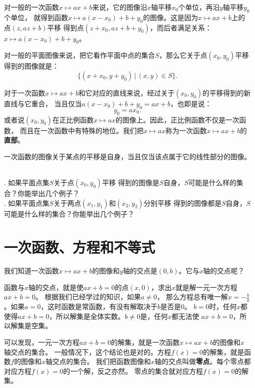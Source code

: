\documentclass[12pt,UTF8,fontset=none]{ctexbook}
\begin{document}
对一般的一次函数$x\mapsto ax+b$来说，它的图像沿$x$轴平移$x_0$个单位，再沿$y$轴平移$y_0$个单位，
就得到函数$x\mapsto a(x-x_0)+b+y_0$的图像。这是因为$x\mapsto ax+b$上的点$(z, az+b)$平移
得到点$(z+x_0, az+b+y_0)$，而后者满足关系：$x\mapsto a(x-x_0)+b+y_0$。

对一般的平面图像来说，把它看作平面中点的集合$S$，那么它关于点$(x_0, y_0)$平移
得到的图像就是：
$$\{(x+x_0, y+y_0) \,|\, (x,y)\in S \}.$$

对于一次函数$x\mapsto ax+b$和它对应的直线来说，经过关于$(x_0, y_0)$的平移得到的新直线与它重合，
当且仅当$a(x-x_0)+b+y_0 = ax + b$，也即是说：
$$ y_0 = ax_0.$$
或者说$(x_0, y_0)$在正比例函数$x\mapsto ax$的图像上。因此，正比例函数不仅是一次函数，
而且在一次函数中有特殊的地位。我们把$x\mapsto ax$称为一次函数$x\mapsto ax+b$的\textbf{直部}。

\begin{tm}\label{tm:5-2-0}
    一次函数的图像关于某点的平移是自身，当且仅当该点属于它的线性部分的图像。
\end{tm}

\begin{sk}\label{sk:5-2-0}
    \mbox{}\\
    . 如果平面点集$S$关于点$(x_0, y_0)$平移
    得到的图像是$S$自身，$S$可能是什么样的集合？你能举出几个例子？ \\
    . 如果平面点集$S$关于两点$(x_1, y_1)$和$(x_2, y_2)$分别平移
    得到的图像都是$S$自身，$S$可能是什么样的集合？你能举出几个例子？
\end{sk}

\section{一次函数、方程和不等式}
我们知道一次函数$x\mapsto ax + b$的图像和$y$轴的交点是$(0, b)$。它与$x$轴的交点呢？

函数与$x$轴的交点，就是使$ax + b = 0$的点$(x, 0)$，求出$x$就是解一元一次方程$ax + b = 0$。
根据我们已经学过的知识，如果$a\neq 0$，
那么方程总有唯一解$x= -\frac{b}{a}$。如果$a = 0$，这时函数是常函数，有没有解取决于$b$是否是$0$。
$b = 0$时，任何$x$都使得$ax + b = 0$，所以解集是全体实数。$b \neq 0$是，任何$x$都无法使
$ax + b = 0$，所以解集是空集。

可以发现，一元一次方程$ax + b = 0$的解集，就是一次函数$x\mapsto ax + b$的图像和$x$轴交点的集合。
一般情况下，这个结论也是对的。方程$f(x) = 0$的解集，就是函数$f$的图像和$x$轴交点的集合。
我们把函数图像和$x$轴的交点叫做\textbf{零点}。每个零点都对应方程$f(x) = 0$的一个解，反之亦然。
零点的集合就对应方程$f(x) = 0$的解集。
\end{document}
